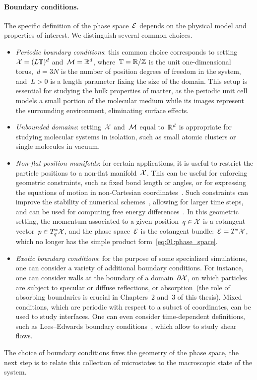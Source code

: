 \paragraph{Boundary conditions.}
The specific definition of the phase space~$\mathcal{E}$ depends on the physical model and properties of interest. We distinguish several common choices.
\begin{itemize}
    \item{\textit{Periodic boundary conditions}: this common choice corresponds to setting~$\mathcal{X} = (L\mathbb{T})^d$ and~$\mathcal{M}=\mathbb{R}^d$, where~$\mathbb{T}=\mathbb{R}/\mathbb{Z}$ is the unit one-dimensional torus,~$d=3N$ is the number of position degrees of freedom in the system, and~$L>0$ is a length parameter fixing the size of the domain. This setup is essential for studying the bulk properties of matter, as the periodic unit cell models a small portion of the molecular medium while its images represent the surrounding environment, eliminating surface effects.}
    \item{\textit{Unbounded domains}: setting~$\mathcal{X}$ and~$\mathcal{M}$ equal to~$\mathbb{R}^d$ is appropriate for studying molecular systems in isolation, such as small atomic clusters or single molecules in vacuum.}
    \item{\textit{Non-flat position manifolds}: for certain applications, it is useful to restrict the particle positions to a non-flat manifold~$\mathcal{X}$. This can be useful for enforcing geometric constraints, such as fixed bond length or angles, or for expressing the equations of motion in non-Cartesian coordinates~\cite{VJ15}. Such constraints can improve the stability of numerical schemes~\cite{RCB77,A83,BKLS95}, allowing for larger time steps, and can be used for computing free energy differences~\cite{SC98,LRS12}. In this geometric setting, the momentum associated to a given position~$q\in\mathcal{X}$ is a cotangent vector~$p\in T_q^*\mathcal{X}$, and the phase space~$\mathcal{E}$ is the cotangent bundle:~$\mathcal{E}=T^*\mathcal{X}$, which no longer has the simple product form~\eqref{eq:01:phase_space}.}
    \item{\textit{Exotic boundary conditions}: for the purpose of some specialized simulations, one can consider a variety of additional boundary conditions. For instance, one can consider walls at the boundary of a domain~$\partial\mathcal{X}$, on which particles are subject to specular or diffuse reflections, or absorption~(the role of absorbing boundaries is crucial in Chapters~2 and~3 of this thesis). Mixed conditions, which are periodic with respect to a subset of coordinates, can be used to study interfaces. One can even consider time-dependent definitions, such as Lees--Edwards boundary conditions~\cite{LE72}, which allow to study shear flows.}
\end{itemize}    
The choice of boundary conditions fixes the geometry of the phase space, the next step is to relate this collection of microstates to the macroscopic state of the system. 

